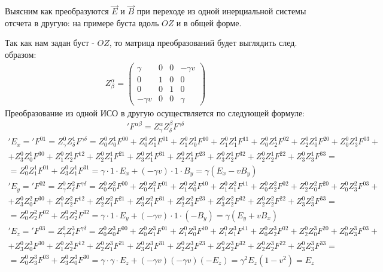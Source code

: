 Выясним как преобразуются $\displaystyle \vec{E}$ и $\displaystyle \vec{B}$  при переходе из одной инерциальной системы отсчета в другую: на примере буста вдоль $OZ$ и в общей форме.

Так как нам задан буст - $OZ$, то матрица преобразований будет выглядить след. образом:
\begin{gather*}
	Z^\alpha_\beta = \begin{pmatrix}
	\gamma & 0 & 0 & -\gamma v \\
	0 & 1 & 0 & 0 \\         
	0 & 0 & 1 & 0 \\
	-\gamma v & 0 & 0 & \gamma
	\end{pmatrix}
\end{gather*}
Преобразование из одной ИСО в другую осуществляется по следующей формуле:
\begin{gather*}
'F^{\alpha \beta} = Z^\alpha_\gamma Z^\beta_\delta F^{\gamma \delta}
\end{gather*}
\begin{gather*}
'E_x ='F^{01} = Z^0_\gamma Z^1_\delta F^{\gamma \delta} = Z^0_0 Z^1_0 F^{00}+Z^0_0 Z^1_1 F^{01}+Z^0_1 Z^1_0 F^{10}+Z^0_1 Z^1_1 F^{11}+Z^0_0 Z^1_2 F^{02}+Z^0_2 Z^1_0 F^{20}+Z^0_0 Z^1_3 F^{03}+\\+Z^0_3 Z^1_0 F^{30}+Z^0_1 Z^1_2 F^{12}+Z^0_2 Z^1_1 F^{21}+Z^0_3 Z^1_1 F^{31}+Z^0_2 Z^1_3 F^{23}+Z^0_3 Z^1_2 F^{32}+Z^0_2 Z^1_2 F^{22}+Z^0_3 Z^1_3 F^{33}=\\
=Z^0_0 Z^1_1 F^{01}+Z^0_3 Z^1_1 F^{31}=\gamma \cdot 1 \cdot E_x+(-\gamma v)\cdot 1 \cdot B_y = \gamma (E_x-vB_y)
\end{gather*}
\begin{gather*}
'E_y ='F^{02} = Z^0_\gamma Z^2_\delta F^{\gamma \delta} = Z^0_0 Z^2_0 F^{00}+Z^0_0 Z^2_1 F^{01}+Z^0_1 Z^2_0 F^{10}+Z^0_1 Z^2_1 F^{11}+Z^0_0 Z^2_2 F^{02}+Z^0_2 Z^2_0 F^{20}+Z^0_0 Z^2_3 F^{03}+\\+Z^0_3 Z^2_0 F^{30}+Z^0_1 Z^2_2 F^{12}+Z^0_2 Z^2_1 F^{21}+Z^0_3 Z^2_1 F^{31}+Z^0_2 Z^2_3 F^{23}+Z^0_3 Z^2_2 F^{32}+Z^0_2 Z^2_2 F^{22}+Z^0_3 Z^2_3 F^{33}=\\
=Z^0_0 Z^2_2 F^{02}+Z^0_3 Z^2_2 F^{32}=\gamma \cdot 1 \cdot E_y+(-\gamma v)\cdot 1 \cdot (-B_y) = \gamma (E_y+vB_x)
\end{gather*}
\begin{gather*}
'E_z ='F^{03} = Z^0_\gamma Z^3_\delta F^{\gamma \delta} = Z^0_0 Z^3_0 F^{00}+Z^0_0 Z^3_1 F^{01}+Z^0_1 Z^3_0 F^{10}+Z^0_1 Z^3_1 F^{11}+Z^0_0 Z^3_2 F^{02}+Z^0_2 Z^3_0 F^{20}+Z^0_0 Z^3_3 F^{03}+\\+Z^0_3 Z^3_0 F^{30}+Z^0_1 Z^3_2 F^{12}+Z^0_2 Z^3_1 F^{21}+Z^0_3 Z^3_1 F^{31}+Z^0_2 Z^3_3 F^{23}+Z^0_3 Z^3_2 F^{32}+Z^0_2 Z^3_2 F^{22}+Z^0_3 Z^3_3 F^{33}=\\
=Z^0_0 Z^3_3 F^{03}+Z^0_3 Z^3_0 F^{30}=\gamma \cdot \gamma \cdot E_z+(-\gamma v)(-\gamma v)(-E_z) = \gamma ^2 E_z(1-v^2) = E_z
\end{gather*}
